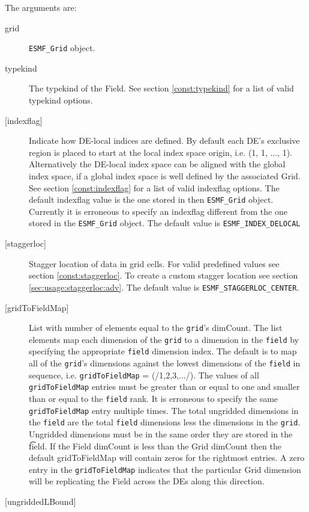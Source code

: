    The arguments are:
   \begin{description}
   \item [grid]
   {\tt ESMF\_Grid} object.
   \item[typekind]
   The typekind of the Field. See section \ref{const:typekind}
   for a list of valid typekind options.
   \item[{[indexflag]}]
   Indicate how DE-local indices are defined. By default each DE's
   exclusive region is placed to start at the local index space origin,
   i.e. (1, 1, ..., 1). Alternatively the DE-local index space can be
   aligned with the global index space, if a global index space is well
   defined by the associated Grid. See section \ref{const:indexflag}
   for a list of valid indexflag options. The default indexflag value is the
   one stored in then {\tt ESMF\_Grid} object. Currently it is
   erroneous to specify an indexflag
   different from the one stored in the {\tt ESMF\_Grid} object. The default
   value is {\tt ESMF\_INDEX\_DELOCAL}
   \item [{[staggerloc]}]
   Stagger location of data in grid cells. For valid
   predefined values see section \ref{const:staggerloc}.
   To create a custom stagger location see section
   \ref{sec:usage:staggerloc:adv}. The default
   value is {\tt ESMF\_STAGGERLOC\_CENTER}.
   \item [{[gridToFieldMap]}]
   List with number of elements equal to the
   {\tt grid}'s dimCount. The list elements map each dimension
   of the {\tt grid} to a dimension in the {\tt field} by
   specifying the appropriate {\tt field} dimension index. The default is to
   map all of the {\tt grid}'s dimensions against the lowest dimensions of
   the {\tt field} in sequence, i.e. {\tt gridToFieldMap} = (/1,2,3,.../).
   The values of all {\tt gridToFieldMap} entries must be greater than or equal
   to one and smaller than or equal to the {\tt field} rank.
   It is erroneous to specify the same {\tt gridToFieldMap} entry
   multiple times. The total ungridded dimensions in the {\tt field}
   are the total {\tt field} dimensions less
   the dimensions in
   the {\tt grid}. Ungridded dimensions must be in the same order they are
   stored in the {\t field}.
   If the Field dimCount is less than the Grid dimCount then the default
   gridToFieldMap will contain zeros for the rightmost entries. A zero
   entry in the {\tt gridToFieldMap} indicates that the particular
   Grid dimension will be replicating the Field across the DEs along
   this direction.
   \item [{[ungriddedLBound]}]

\end{description}
